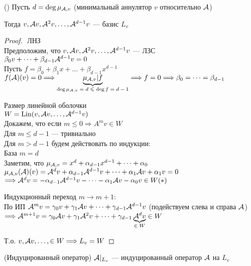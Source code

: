 \begin{theorem}()
    Пусть $d = \deg \mu_{\mathcal{A}, v}$ (минимальный аннулятор $v$ относительно $\mathcal{A}$)

    Тогда $v, \mathcal{A} v, \mathcal{A}^2 v, \dots, \mathcal{A}^{d - 1} v $ --- базис $L_v$

    \begin{proof}
    $ $ \newline
    \quad ЛНЗ \\
    Предположим, что $v, \mathcal{A} v, \mathcal{A}^2 v, \dots, \mathcal{A}^{d - 1} v $ --- ЛЗС \\
    $\beta_0 v + \dots + \beta_{d - 1} \mathcal{A}^{d - 1} v = 0$ \\
    Пусть $ f = \beta_0 + \beta_1 x + \dots + \beta_{d - 1} x^{d - 1} $ \\
    $ f(\mathcal{A})(v) = 0 \Longrightarrow  \underbrace{\mu_{\mathcal{A}, v} | f}_{\text{$ \deg{ \mu_{\mathcal{A}, v}}= d \leqslant \deg{f} = d - 1 $}}  \Longrightarrow f = 0 \Longrightarrow \beta_0 = \dots = \beta_{d - 1}$

    \quad Размер линейной оболочки \\ 
    $ W = \operatorname{Lin} (v, \mathcal{A} v, \dots, \mathcal{A}^{d - 1} v) $ \\
    Докажем, что если $m \leqslant 0 \Longrightarrow A^m v \in W$ \\
    Для $ m \leqslant d - 1$ --- тривиально \\
    Для $m > d - 1$ будем действовать по индукции: \\
    \quad База $m = d$ \\
    Заметим, что $\mu_{\mathcal{A}, v} = x^d + \alpha_{d - 1} x^{d - 1} + \dots + \alpha_0$ \\
    $\mu_{\mathcal{A}, v}(\mathcal{A})(v) = \mathcal{A}^dv + \alpha_{d - 1} \mathcal{A}^{d - 1}v + \dots + \alpha_1 \mathcal{A} v + \alpha_1 v = 0$ \\
    $\Longrightarrow \mathcal{A}^d v = - \alpha_{d - 1} \mathcal{A}^{d - 1}v - \dots - \alpha_1 \mathcal{A} v - \alpha_0 v \in W (*)$ 

    \quad Индукционный переход $m \to m + 1:$ \\
    По ИП $\mathcal{A}^m v = \gamma_0 v + \gamma_1 \mathcal{A} v + \dots + \gamma_{d - 1} \mathcal{A}^{d - 1} v$ (подействуем слева и справа $\mathcal{A}$)
    $\Longrightarrow \mathcal{A}^{m + 1} v = \gamma_0 \mathcal{A} v + \gamma_1 \mathcal{A}^2 v + \dots + \gamma_{d - 1} \underbrace{\mathcal{A}^{d} v}_{\text{$ \in W $}}  \in W$

    Т.о. $v, \mathcal{A} v, \dots, \in W \Longrightarrow L_v = W$
    \end{proof}
\end{theorem}

\begin{conj}(Индуцированный оператор)
    $\mathcal{A} |_{L_{v}}$ --- индуцированный оператор $\mathcal{A}$ на $L_v$
\end{conj}

